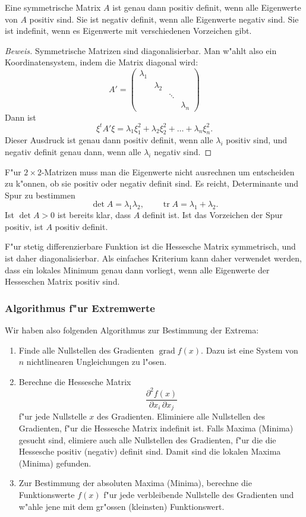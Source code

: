 \begin{satz}Eine symmetrische Matrix $A$ ist genau dann positiv
definit, wenn alle Eigenwerte von $A$ positiv sind. Sie ist negativ
definit, wenn alle Eigenwerte negativ sind. Sie ist indefinit,
wenn es Eigenwerte mit verschiedenen Vorzeichen gibt.
\end{satz}

\begin{proof}[Beweis]
Symmetrische Matrizen sind diagonalisierbar.
Man w"ahlt also ein Koordinatensystem, indem die Matrix diagonal wird:
\[
A'=\begin{pmatrix}
\lambda_1&         &      &         \\
         &\lambda_2&      &         \\
         &         &\ddots&         \\
         &         &      &\lambda_n
\end{pmatrix}
\]
Dann ist
\[
\xi^tA'\xi =\lambda_1\xi_1^2+\lambda_2\xi_2^2+\dots+\lambda_n\xi_n^2.
\]
Dieser Ausdruck ist genau dann positiv definit, wenn alle $\lambda_i$ positiv
sind, und negativ definit genau dann, wenn alle $\lambda_i$
negativ sind.
\end{proof}

F"ur $2\times 2$-Matrizen muss man die Eigenwerte nicht ausrechnen
um entscheiden zu k"onnen, ob sie positiv oder negativ definit sind.
Es reicht, Determinante und Spur zu bestimmen
\[
\det A = \lambda_1\lambda_2,\qquad \operatorname{tr} A=\lambda_1+\lambda_2.
\]
Ist $\det A >0$ ist bereits klar, dass $A$ definit ist. Ist das Vorzeichen
der Spur positiv, ist $A$ positiv definit.

F"ur stetig differenzierbare Funktion ist die Hessesche Matrix
symmetrisch, und ist daher diagonalisierbar.
Als einfaches Kriterium kann daher
verwendet werden, dass ein lokales Minimum genau dann vorliegt,
wenn alle Eigenwerte der Hesseschen Matrix positiv sind.

\subsubsection{Algorithmus f"ur Extremwerte}
Wir haben also folgenden Algorithmus zur Bestimmung der Extrema:
\begin{enumerate}
\item
Finde alle Nullstellen des Gradienten
$\operatorname{grad}f(x)$.
Dazu ist eine System von $n$ nichtlinearen Ungleichungen zu l"osen.
\item
Berechne die Hessesche Matrix
\[
\frac{\partial^2 f(x)}{\partial x_i\,\partial x_j}
\]
f"ur jede Nullstelle $x$ des Gradienten.
Eliminiere alle Nullstellen
des Gradienten, f"ur die Hessesche Matrix indefinit ist.
Falls Maxima (Minima) gesucht sind, elimiere auch alle Nullstellen
des Gradienten, f"ur die die Hessesche positiv (negativ) definit sind.
Damit sind die lokalen Maxima (Minima) gefunden.
\item 
Zur Bestimmung der absoluten Maxima (Minima), berechne die Funktionswerte
$f(x)$ f"ur jede verbleibende Nullstelle des Gradienten und w"ahle jene
mit dem gr"ossen (kleinsten) Funktionswert.
\end{enumerate}

